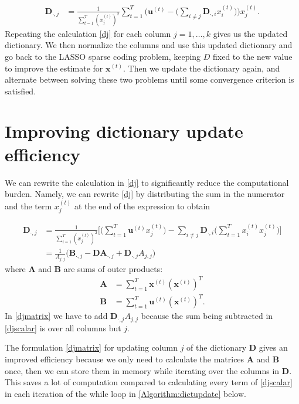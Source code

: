 \documentclass[a4paper, article, oneside, UKenglish]{memoir}
\newcommand{\A}{\mathbb{A}}   %
\newcommand{\0}{\mathbf{0}}
\newcommand{\1}{\mathbf{1}}
\newcommand{\D}{\mathbf{D}}
\renewcommand{\A}{\mathbf{A}}
\newcommand{\B}{\mathbf{B}}
\newcommand{\xt}{\mathbf{x}^{(t)}}
\newcommand{\ut}{\mathbf{u}^{(t)}}
\newcommand{\xtt}{x^{(t)}} %
\newcommand{\mcol}[1]{\mathbf{{#1}}_{\cdotp,j}}
\newcommand{\mcoll}[2]{{\mathbf{#1}}_{\cdotp,#2}}
\begin{document}
\begin{align} \label{dj}
            \mcol{D} &= \frac{1}{\sum_{t=1}^T (\xtt_j)^2}
                        \sum_{t=1}^T \bigg( \ut - 
                        \bigg(\sum_{i\neq j} \mcoll{D}{i} \xtt_i\bigg)
                        \bigg)
                        \xtt_j.  
\end{align}
Repeating the calculation \eqref{dj} for each column $j=1, \dots, k$ gives us the updated dictionary. We then normalize the columns and use this updated dictionary and go back to the LASSO sparse coding problem, keeping $D$ fixed to the new value to improve the estimate for $\xt$. Then we update the dictionary again, and alternate between solving these two problems until some convergence criterion is satisfied. 





\section{Improving dictionary update efficiency} \label{sec:efficiency}
We can rewrite the calculation in \eqref{dj} to significantly reduce the computational burden. Namely, we can rewrite \eqref{dj} by distributing the sum in the numerator and the term $\xtt_j$ at the end of the expression to obtain

\begin{align}
 \mcol{D} &= \frac{1}{\sum_{t=1}^T (\xtt_j)^2}
                        \Bigg[ 
                        \bigg( \sum_{t=1}^T  \ut \xtt_j \bigg) 
                        - \sum_{i\neq j} \mcoll{D}{i} 
                                \bigg( \sum_{t=1}^T \xtt_i \xtt_j
                        \bigg)
                        \Bigg] \label{djscalar}\\
        &= \frac{1}{A_{j, j}} \big( \mcoll{B}{j} - \D \mcoll{A}{j} + \mcoll{D}{j} A_{j, j}) \label{djmatrix}
\end{align}
where $\A$ and $\B$ are sums of outer products:
\begin{align*}
    \A &= \sum_{t=1}^T \xt (\xt)^T \\
    \B &= \sum_{t=1}^T \ut (\xt)^T.
\end{align*}
In \eqref{djmatrix} we have to add $\mcoll{D}{j} A_{j,j}$ because the sum being subtracted in \eqref{djscalar} is over all columns but $j$.

The formulation \eqref{djmatrix} for updating column $j$ of the dictionary $\D$ gives an improved efficiency because we only need to calculate the matrices $\A$ and $\B$ once, then we can store them in memory while iterating over the columns in $\D$. This saves a lot of computation compared to calculating every term of \eqref{djscalar} in each iteration of the while loop in \cref{Algorithm:dictupdate} below.
\end{document}
